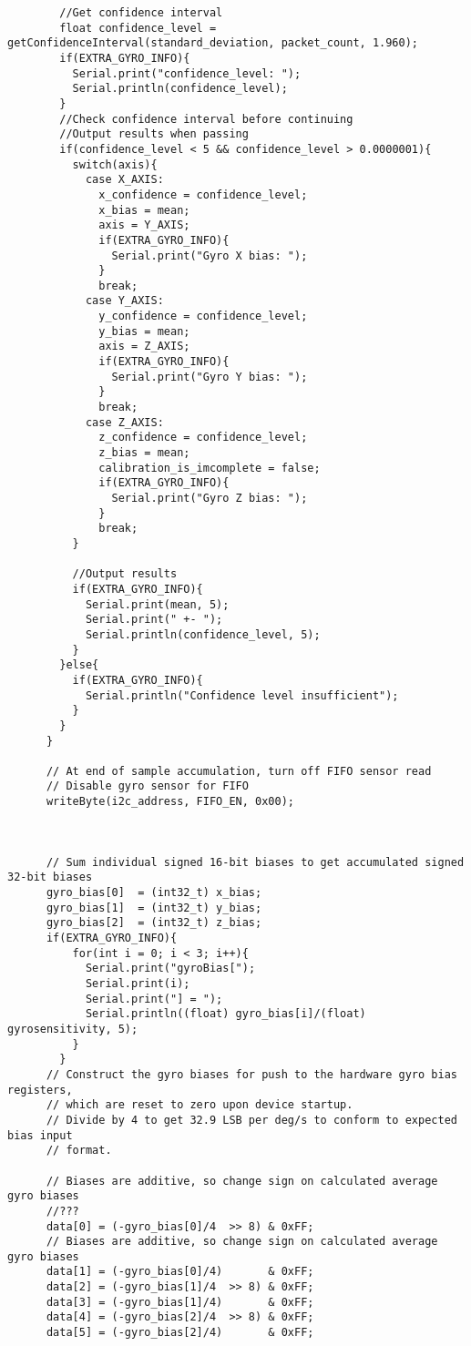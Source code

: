 \begin{lstlisting}
	    //Get confidence interval
	    float confidence_level = getConfidenceInterval(standard_deviation, packet_count, 1.960);
	    if(EXTRA_GYRO_INFO){
	      Serial.print("confidence_level: ");
	      Serial.println(confidence_level);
	    }
	    //Check confidence interval before continuing
	    //Output results when passing
	    if(confidence_level < 5 && confidence_level > 0.0000001){
	      switch(axis){
	        case X_AXIS:
	          x_confidence = confidence_level;
	          x_bias = mean;
	          axis = Y_AXIS;
	          if(EXTRA_GYRO_INFO){
	            Serial.print("Gyro X bias: ");
	          }
	          break;
	        case Y_AXIS:
	          y_confidence = confidence_level;
	          y_bias = mean;
	          axis = Z_AXIS;
	          if(EXTRA_GYRO_INFO){
	            Serial.print("Gyro Y bias: ");
	          }
	          break;
	        case Z_AXIS:
	          z_confidence = confidence_level;
	          z_bias = mean;
	          calibration_is_imcomplete = false;
	          if(EXTRA_GYRO_INFO){
	            Serial.print("Gyro Z bias: ");
	          }
	          break;
	      }

	      //Output results
	      if(EXTRA_GYRO_INFO){
	        Serial.print(mean, 5);
	        Serial.print(" +- ");
	        Serial.println(confidence_level, 5);
	      }
	    }else{
	      if(EXTRA_GYRO_INFO){
	        Serial.println("Confidence level insufficient");
	      }
	    }
	  }

	  // At end of sample accumulation, turn off FIFO sensor read
	  // Disable gyro sensor for FIFO
	  writeByte(i2c_address, FIFO_EN, 0x00);



	  // Sum individual signed 16-bit biases to get accumulated signed 32-bit biases
	  gyro_bias[0]  = (int32_t) x_bias;
	  gyro_bias[1]  = (int32_t) y_bias;
	  gyro_bias[2]  = (int32_t) z_bias;
	  if(EXTRA_GYRO_INFO){
	      for(int i = 0; i < 3; i++){
	        Serial.print("gyroBias[");
	        Serial.print(i);
	        Serial.print("] = ");
	        Serial.println((float) gyro_bias[i]/(float) gyrosensitivity, 5);
	      }
	    }
	  // Construct the gyro biases for push to the hardware gyro bias registers,
	  // which are reset to zero upon device startup.
	  // Divide by 4 to get 32.9 LSB per deg/s to conform to expected bias input
	  // format.

	  // Biases are additive, so change sign on calculated average gyro biases
	  //???
	  data[0] = (-gyro_bias[0]/4  >> 8) & 0xFF;
	  // Biases are additive, so change sign on calculated average gyro biases
	  data[1] = (-gyro_bias[0]/4)       & 0xFF;
	  data[2] = (-gyro_bias[1]/4  >> 8) & 0xFF;
	  data[3] = (-gyro_bias[1]/4)       & 0xFF;
	  data[4] = (-gyro_bias[2]/4  >> 8) & 0xFF;
	  data[5] = (-gyro_bias[2]/4)       & 0xFF;


\end{lstlisting}
